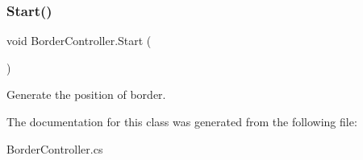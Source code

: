 \hypertarget{class_border_controller_ac0604cefdc2b662a396263e5271dffcf}{}\label{class_border_controller_ac0604cefdc2b662a396263e5271dffcf} 
\subsubsection{\texorpdfstring{Start()}{Start()}}
{\footnotesize\ttfamily void Border\+Controller.\+Start (\begin{DoxyParamCaption}{ }\end{DoxyParamCaption})\hspace{0.3cm}{\ttfamily [private]}}



Generate the position of border. 



The documentation for this class was generated from the following file\+:\begin{DoxyCompactItemize}
\item 
Border\+Controller.\+cs\end{DoxyCompactItemize}
